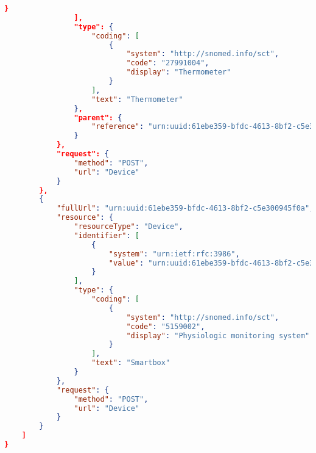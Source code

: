 \begin{itemize}
\begin{lstlisting}[language=json]
                    } 
                ], 
                "type": { 
                    "coding": [ 
                        { 
                            "system": "http://snomed.info/sct", 
                            "code": "27991004", 
                            "display": "Thermometer" 
                        } 
                    ], 
                    "text": "Thermometer" 
                }, 
                "parent": { 
                    "reference": "urn:uuid:61ebe359-bfdc-4613-8bf2-c5e300945f0a" 
                } 
            }, 
            "request": { 
                "method": "POST", 
                "url": "Device" 
            } 
        }, 
        { 
            "fullUrl": "urn:uuid:61ebe359-bfdc-4613-8bf2-c5e300945f0a",  
            "resource": { 
                "resourceType": "Device", 
                "identifier": [ 
                    { 
                        "system": "urn:ietf:rfc:3986", 
                        "value": "urn:uuid:61ebe359-bfdc-4613-8bf2-c5e300945f0a"  
                    } 
                ], 
                "type": { 
                    "coding": [ 
                        { 
                            "system": "http://snomed.info/sct", 
                            "code": "5159002", 
                            "display": "Physiologic monitoring system" 
                        } 
                    ], 
                    "text": "Smartbox" 
                } 
            }, 
            "request": { 
                "method": "POST", 
                "url": "Device" 
            } 
        } 
    ] 
}         
    \end{lstlisting}
\end{itemize}